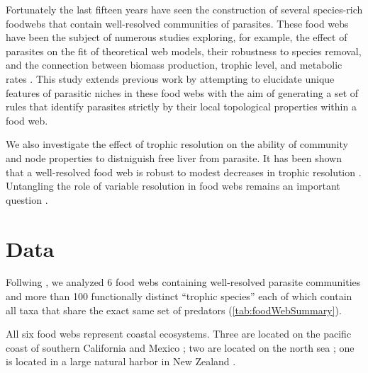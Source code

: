 \documentclass[../dissertation.tex]{subfiles}
\begin{document}
Fortunately the last fifteen years have seen the construction of several
species-rich foodwebs that contain well-resolved communities of parasites.
These food webs have been the subject of numerous studies exploring, for
example, the effect of parasites on the fit of theoretical web models, their
robustness to species removal, and the connection between biomass production,
trophic level, and metabolic rates \cite{Dunne2013, Lafferty2012,
Hechinger2011b}. This study extends previous work by attempting to elucidate
unique features of parasitic niches in these food webs with the aim of
generating a set of rules that identify parasites strictly by their local
topological properties within a food web.

We also investigate the effect of trophic resolution on the ability of
community and node properties to distniguish free liver from parasite. It has
been shown that a well-resolved food web is robust to modest decreases in
trophic resolution \cite{Martinez1991}. Untangling the role of variable 
resolution in food webs remains an important question \cite{Martinez1999}.

\section{Data} 
Follwing \cite{Dunne2013}, we analyzed 6 food webs containing well-resolved
parasite communities and more than 100 functionally distinct ``trophic
species'' each of which contain all taxa that share the exact same set of
predators (\ref{tab:foodWebSummary}).


All six food webs represent coastal ecosystems. Three are located on the pacific
coast of southern California and Mexico \cite{Hechinger2011}; two are located
on the north sea \cite{Thieltges2005,Zander2011}; one is located in a large
natural harbor in New Zealand \cite{Mouritsen2006}. 
\end{document}
